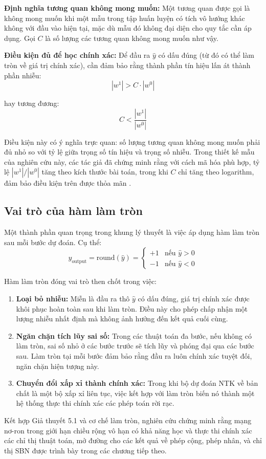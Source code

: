 	\textbf{Định nghĩa tương quan không mong muốn:} Một tương quan được gọi là không mong muốn khi một mẫu trong tập huấn luyện có tích vô hướng khác không với đầu vào hiện tại, mặc dù mẫu đó không đại diện cho quy tắc cần áp dụng. Gọi $C$ là số lượng các tương quan không mong muốn như vậy.

\textbf{Điều kiện đủ để học chính xác:} Để đầu ra $\hat{y}$ có dấu đúng (từ đó có thể làm tròn về giá trị chính xác), cần đảm bảo rằng thành phần tín hiệu lấn át thành phần nhiễu:
\begin{equation}
    |w^1| > C \cdot |w^0|
\end{equation}

hay tương đương:
\begin{equation}
    C < \frac{|w^1|}{|w^0|}
\end{equation}

Điều kiện này có ý nghĩa trực quan: số lượng tương quan không mong muốn phải đủ nhỏ so với tỷ lệ giữa trọng số tín hiệu và trọng số nhiễu. Trong thiết kế mẫu của nghiên cứu này, các tác giả đã chứng minh rằng với cách mã hóa phù hợp, tỷ lệ $|w^1|/|w^0|$ tăng theo kích thước bài toán, trong khi $C$ chỉ tăng theo logarithm, đảm bảo điều kiện trên được thỏa mãn \cite{de_luca_2025}.

\subsection{Vai trò của hàm làm tròn}

Một thành phần quan trọng trong khung lý thuyết là việc áp dụng hàm làm tròn sau mỗi bước dự đoán. Cụ thể:
\begin{equation}
    y_{\text{output}} = \text{round}(\hat{y}) = 
    \begin{cases}
        +1 & \text{nếu } \hat{y} > 0 \\
        -1 & \text{nếu } \hat{y} < 0
    \end{cases}
\end{equation}

Hàm làm tròn đóng vai trò then chốt trong việc:
\begin{enumerate}
    \item \textbf{Loại bỏ nhiễu:} Miễn là đầu ra thô $\hat{y}$ có dấu đúng, giá trị chính xác được khôi phục hoàn toàn sau khi làm tròn. Điều này cho phép chấp nhận một lượng nhiễu nhất định mà không ảnh hưởng đến kết quả cuối cùng.
    
    \item \textbf{Ngăn chặn tích lũy sai số:} Trong các thuật toán đa bước, nếu không có làm tròn, sai số nhỏ ở các bước trước sẽ tích lũy và phóng đại qua các bước sau. Làm tròn tại mỗi bước đảm bảo rằng đầu ra luôn chính xác tuyệt đối, ngăn chặn hiện tượng này.
    
    \item \textbf{Chuyển đổi xấp xỉ thành chính xác:} Trong khi bộ dự đoán NTK về bản chất là một bộ xấp xỉ liên tục, việc kết hợp với làm tròn biến nó thành một hệ thống thực thi chính xác các phép toán rời rạc.
\end{enumerate}

Kết hợp Giả thuyết 5.1 và cơ chế làm tròn, nghiên cứu chứng minh rằng mạng nơ-ron trong giới hạn chiều rộng vô hạn có khả năng học và thực thi chính xác các chỉ thị thuật toán, mở đường cho các kết quả về phép cộng, phép nhân, và chỉ thị SBN được trình bày trong các chương tiếp theo.
